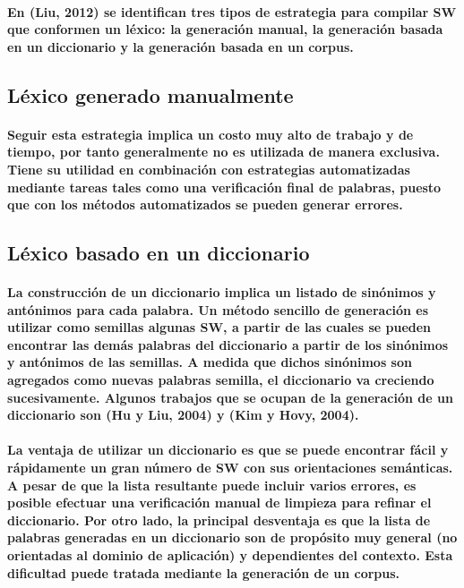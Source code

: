 \paragraph{En (Liu, 2012) se identifican tres tipos de estrategia para compilar SW que conformen un l\'exico: la generaci\'on manual, la generaci\'on basada en un diccionario y la generaci\'on basada en un corpus.}

\subsection{L\'exico generado manualmente}
\paragraph{Seguir esta estrategia implica un costo muy alto de trabajo y de tiempo, por tanto generalmente no es utilizada de manera exclusiva. Tiene su utilidad en combinaci\'on con estrategias automatizadas mediante tareas tales como una verificaci\'on final de palabras, puesto que con los m\'etodos automatizados se pueden generar errores.}

\subsection{L\'exico basado en un diccionario}
\paragraph{La construcci\'on de un diccionario implica un listado de sin\'onimos y ant\'onimos para cada palabra. Un m\'etodo sencillo de generaci\'on es utilizar como semillas algunas SW, a partir de las cuales se pueden encontrar las dem\'as palabras del diccionario a partir de los sin\'onimos y ant\'onimos de las semillas. A medida que dichos sin\'onimos son agregados como nuevas palabras semilla, el diccionario va creciendo sucesivamente. Algunos trabajos que se ocupan de la generaci\'on de un diccionario son (Hu y Liu, 2004) y (Kim y Hovy, 2004).}
\paragraph{La ventaja de utilizar un diccionario es que se puede encontrar f\'acil y r\'apidamente un gran n\'umero de SW con sus orientaciones sem\'anticas. A pesar de que la lista resultante puede incluir varios errores, es posible efectuar una verificaci\'on manual de limpieza para refinar el diccionario. Por otro lado, la principal desventaja es que la lista de palabras generadas en un diccionario son de prop\'osito muy general (no orientadas al dominio de aplicaci\'on) y dependientes del contexto. Esta dificultad puede tratada mediante la generaci\'on de un corpus.}

